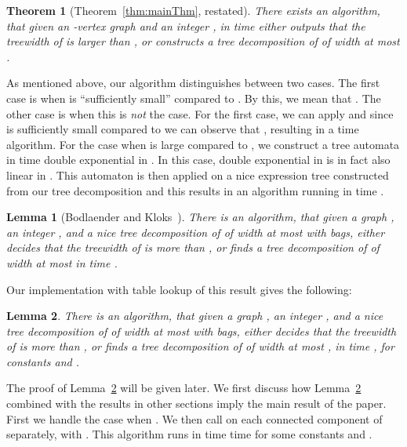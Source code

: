 \documentclass[a4paper,11pt]{article}
\newtheorem{theorem}{Theorem}
\newtheorem{lemma}{Lemma}[section]
\theoremstyle{definition}
\theoremstyle{remark}
\begin{document}
\begin{theorem}[Theorem~\ref{thm:mainThm}, restated]
  There exists an algorithm, that given an -vertex graph  and an
  integer , in time  either outputs that the treewidth
  of  is larger than , or constructs a tree decomposition of 
  of width at most .
\end{theorem}



As mentioned above, our algorithm distinguishes between two cases.
The first case is when  is ``sufficiently small'' compared to .
By this, we mean that .  The other case is
when this is \emph{not} the case.  For the first case, we can apply
 and since  is sufficiently small compared to  we can
observe that , resulting in a  time
algorithm.  For the case when  is large compared to , we
construct a tree automata in time double exponential in .  In this
case, double exponential in  is in fact also linear in .  This
automaton is then applied on a nice expression tree constructed from
our tree decomposition and this results in an algorithm running in
time .

\begin{lemma}[Bodlaender and Kloks~\cite{BodlaenderK96}]
  There is an algorithm, that given a graph , an integer , and a
  nice tree decomposition of  of width at most  with 
  bags, either decides that the treewidth of  is more than , or
  finds a tree decomposition of  of width at most  in time
  .
  \label{lemma:BodlaenderKloks}
\end{lemma}

Our implementation with table lookup of this result gives the
following:

\begin{lemma}
  There is an algorithm, that given a graph , an integer , and a
  nice tree decomposition of  of width at most  with
   bags, either decides that the treewidth of  is more than 
  , or finds a tree decomposition of  of width at most , in time
  , for constants
   and .
  \label{lemma:tablelookupBodlaenderKloks}
\end{lemma}

The proof of Lemma~\ref{lemma:tablelookupBodlaenderKloks} will be
given later.  We first discuss how
Lemma~\ref{lemma:tablelookupBodlaenderKloks} combined with the results
in other sections imply the main result of the paper.  First we handle
the case when .  We then call  on
each connected component of  separately, with .  This
algorithm runs in time  time for some constants  and .
\end{document}
